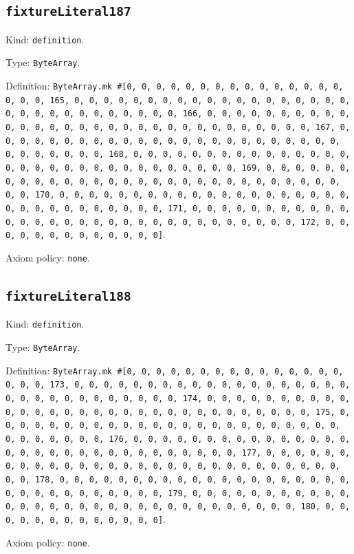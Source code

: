 \documentclass[11pt]{article}
\begin{document}
\subsection*{\texttt{fixtureLiteral187}}
\noindent Kind: \texttt{definition}.\par
\noindent Type: \texttt{ByteArray}.\par
\noindent Definition: \texttt{ByteArray.mk \#[0, 0, 0, 0, 0, 0, 0, 0, 0, 0, 0, 0, 0, 0, 0, 0, 0, 0, 165, 0, 0, 0, 0, 0, 0, 0, 0, 0, 0, 0, 0, 0, 0, 0, 0, 0, 0, 0, 0, 0, 0, 0, 0, 0, 0, 0, 0, 0, 0, 0, 166, 0, 0, 0, 0, 0, 0, 0, 0, 0, 0, 0, 0, 0, 0, 0, 0, 0, 0, 0, 0, 0, 0, 0, 0, 0, 0, 0, 0, 0, 0, 0, 167, 0, 0, 0, 0, 0, 0, 0, 0, 0, 0, 0, 0, 0, 0, 0, 0, 0, 0, 0, 0, 0, 0, 0, 0, 0, 0, 0, 0, 0, 0, 0, 168, 0, 0, 0, 0, 0, 0, 0, 0, 0, 0, 0, 0, 0, 0, 0, 0, 0, 0, 0, 0, 0, 0, 0, 0, 0, 0, 0, 0, 0, 0, 0, 169, 0, 0, 0, 0, 0, 0, 0, 0, 0, 0, 0, 0, 0, 0, 0, 0, 0, 0, 0, 0, 0, 0, 0, 0, 0, 0, 0, 0, 0, 0, 0, 170, 0, 0, 0, 0, 0, 0, 0, 0, 0, 0, 0, 0, 0, 0, 0, 0, 0, 0, 0, 0, 0, 0, 0, 0, 0, 0, 0, 0, 0, 0, 0, 171, 0, 0, 0, 0, 0, 0, 0, 0, 0, 0, 0, 0, 0, 0, 0, 0, 0, 0, 0, 0, 0, 0, 0, 0, 0, 0, 0, 0, 0, 0, 0, 172, 0, 0, 0, 0, 0, 0, 0, 0, 0, 0, 0, 0, 0]}.\par
\noindent Axiom policy: \texttt{none}.\par
\subsection*{\texttt{fixtureLiteral188}}
\noindent Kind: \texttt{definition}.\par
\noindent Type: \texttt{ByteArray}.\par
\noindent Definition: \texttt{ByteArray.mk \#[0, 0, 0, 0, 0, 0, 0, 0, 0, 0, 0, 0, 0, 0, 0, 0, 0, 0, 173, 0, 0, 0, 0, 0, 0, 0, 0, 0, 0, 0, 0, 0, 0, 0, 0, 0, 0, 0, 0, 0, 0, 0, 0, 0, 0, 0, 0, 0, 0, 0, 174, 0, 0, 0, 0, 0, 0, 0, 0, 0, 0, 0, 0, 0, 0, 0, 0, 0, 0, 0, 0, 0, 0, 0, 0, 0, 0, 0, 0, 0, 0, 0, 175, 0, 0, 0, 0, 0, 0, 0, 0, 0, 0, 0, 0, 0, 0, 0, 0, 0, 0, 0, 0, 0, 0, 0, 0, 0, 0, 0, 0, 0, 0, 0, 176, 0, 0, 0, 0, 0, 0, 0, 0, 0, 0, 0, 0, 0, 0, 0, 0, 0, 0, 0, 0, 0, 0, 0, 0, 0, 0, 0, 0, 0, 0, 0, 177, 0, 0, 0, 0, 0, 0, 0, 0, 0, 0, 0, 0, 0, 0, 0, 0, 0, 0, 0, 0, 0, 0, 0, 0, 0, 0, 0, 0, 0, 0, 0, 178, 0, 0, 0, 0, 0, 0, 0, 0, 0, 0, 0, 0, 0, 0, 0, 0, 0, 0, 0, 0, 0, 0, 0, 0, 0, 0, 0, 0, 0, 0, 0, 179, 0, 0, 0, 0, 0, 0, 0, 0, 0, 0, 0, 0, 0, 0, 0, 0, 0, 0, 0, 0, 0, 0, 0, 0, 0, 0, 0, 0, 0, 0, 0, 180, 0, 0, 0, 0, 0, 0, 0, 0, 0, 0, 0, 0, 0]}.\par
\noindent Axiom policy: \texttt{none}.\par
\end{document}
